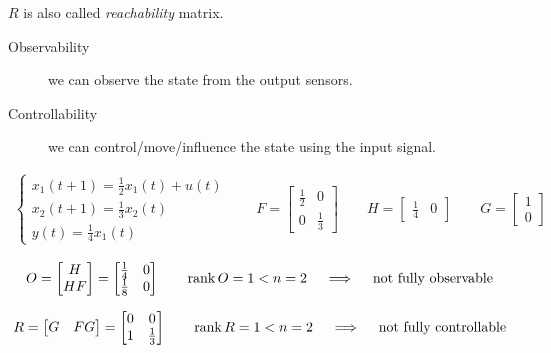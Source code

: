 $R$ is also called \emph{reachability} matrix.

\begin{remark}
    \begin{description}
        \item[Observability] we can observe the state from the output sensors.
        \item[Controllability] we can control/move/influence the state using the input signal.
    \end{description}
\end{remark}

\begin{example}
    \begin{align*}
        \begin{cases}
            x_1(t+1) = \frac{1}{2} x_1(t) + u(t) \\
            x_2(t+1) = \frac{1}{3}x_2(t) \\
            y(t) = \frac{1}{4}x_1(t)
        \end{cases}
        \qquad
        F = \begin{bmatrix}
            \frac{1}{2} & 0 \\
            0 & \frac{1}{3}
        \end{bmatrix}
        \qquad
        H = \begin{bmatrix}
            \frac{1}{4} & 0
        \end{bmatrix}
        \qquad
        G = \begin{bmatrix}
            1 \\
            0
        \end{bmatrix}
    \end{align*}

    \[
        O = \begin{bmatrix}
            H \\
            HF
        \end{bmatrix} = \begin{bmatrix}
            \frac{1}{4} & 0 \\
            \frac{1}{8} & 0
        \end{bmatrix}
        \qquad
        \operatorname*{rank} O = 1 < n = 2
        \quad\implies\quad \text{not fully observable}
    \]

    \[
        R = \begin{bmatrix}
            G & FG
        \end{bmatrix} = \begin{bmatrix}
            0 & 0 \\
            1 & \frac{1}{3}
        \end{bmatrix}
        \qquad
        \operatorname*{rank} R = 1 < n = 2
        \quad\implies\quad \text{not fully controllable}
    \]
\end{example}

